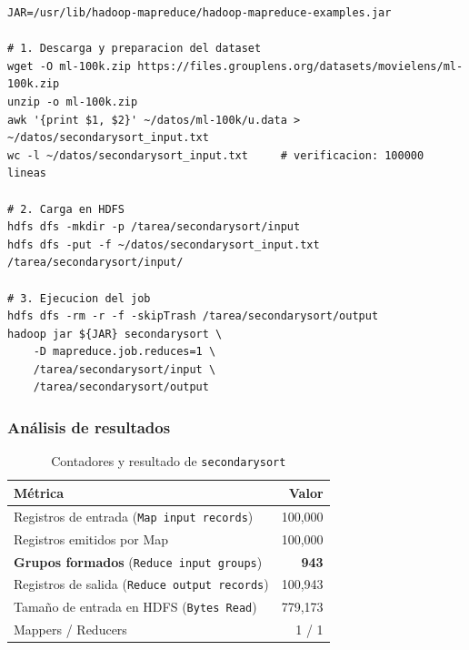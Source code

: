 \begin{lstlisting}[style=sh]
JAR=/usr/lib/hadoop-mapreduce/hadoop-mapreduce-examples.jar

# 1. Descarga y preparacion del dataset
wget -O ml-100k.zip https://files.grouplens.org/datasets/movielens/ml-100k.zip
unzip -o ml-100k.zip
awk '{print $1, $2}' ~/datos/ml-100k/u.data > ~/datos/secondarysort_input.txt
wc -l ~/datos/secondarysort_input.txt     # verificacion: 100000 lineas

# 2. Carga en HDFS
hdfs dfs -mkdir -p /tarea/secondarysort/input
hdfs dfs -put -f ~/datos/secondarysort_input.txt /tarea/secondarysort/input/

# 3. Ejecucion del job
hdfs dfs -rm -r -f -skipTrash /tarea/secondarysort/output
hadoop jar ${JAR} secondarysort \
    -D mapreduce.job.reduces=1 \
    /tarea/secondarysort/input \
    /tarea/secondarysort/output
\end{lstlisting}


\subsubsection{Análisis de resultados}

\begin{table}[H]
\centering
\caption{Contadores y resultado de \texttt{secondarysort}}
\label{tab:secondarysort}
\vspace{0.2cm}
\small
\begin{tabular}{@{}lr@{}}
\toprule
\textbf{Métrica} & \textbf{Valor} \\
\midrule
Registros de entrada (\texttt{Map input records})  & 100,000 \\
Registros emitidos por Map                         & 100,000 \\
\textbf{Grupos formados} (\texttt{Reduce input groups}) & \textbf{943} \\
Registros de salida (\texttt{Reduce output records})& 100,943 \\
Tamaño de entrada en HDFS (\texttt{Bytes Read})    & 779,173 \\
Mappers / Reducers                                 & 1 / 1 \\
\bottomrule
\end{tabular}
\end{table}


